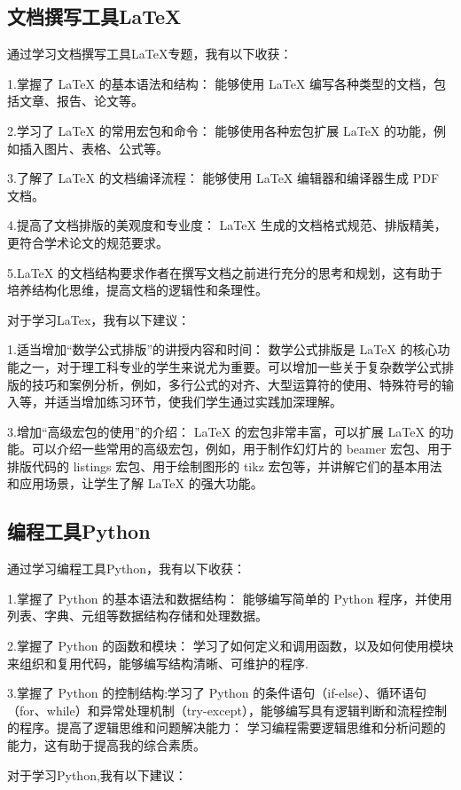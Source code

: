 \documentclass[supercite]{Experimental_Report}
\theoremstyle{definition}
\begin{document}
\subsection{文档撰写工具LaTeX}
通过学习文档撰写工具LaTeX专题，我有以下收获：


\par 1.掌握了 LaTeX 的基本语法和结构： 能够使用 LaTeX 编写各种类型的文档，包括文章、报告、论文等。
\par 2.学习了 LaTeX 的常用宏包和命令： 能够使用各种宏包扩展 LaTeX 的功能，例如插入图片、表格、公式等。
\par 3.了解了 LaTeX 的文档编译流程： 能够使用 LaTeX 编辑器和编译器生成 PDF 文档。
\par 4.提高了文档排版的美观度和专业度： LaTeX 生成的文档格式规范、排版精美，更符合学术论文的规范要求。
\par 5.LaTeX 的文档结构要求作者在撰写文档之前进行充分的思考和规划，这有助于培养结构化思维，提高文档的逻辑性和条理性。
\par 对于学习LaTex，我有以下建议：

\par 1.适当增加“数学公式排版”的讲授内容和时间： 数学公式排版是 LaTeX 的核心功能之一，对于理工科专业的学生来说尤为重要。可以增加一些关于复杂数学公式排版的技巧和案例分析，例如，多行公式的对齐、大型运算符的使用、特殊符号的输入等，并适当增加练习环节，使我们学生通过实践加深理解。
\par 3.增加“高级宏包的使用”的介绍： LaTeX 的宏包非常丰富，可以扩展 LaTeX 的功能。可以介绍一些常用的高级宏包，例如，用于制作幻灯片的 beamer 宏包、用于排版代码的 listings 宏包、用于绘制图形的 tikz 宏包等，并讲解它们的基本用法和应用场景，让学生了解 LaTeX 的强大功能。



\subsection{编程工具Python}
通过学习编程工具Python，我有以下收获：
\par 1.掌握了 Python 的基本语法和数据结构： 能够编写简单的 Python 程序，并使用列表、字典、元组等数据结构存储和处理数据。
\par 2.掌握了 Python 的函数和模块： 学习了如何定义和调用函数，以及如何使用模块来组织和复用代码，能够编写结构清晰、可维护的程序.
\par 3.掌握了 Python 的控制结构:学习了 Python 的条件语句（if-else）、循环语句（for、while）和异常处理机制（try-except），能够编写具有逻辑判断和流程控制的程序。提高了逻辑思维和问题解决能力： 学习编程需要逻辑思维和分析问题的能力，这有助于提高我的综合素质。
\par 对于学习Python,我有以下建议：
\end{document}
